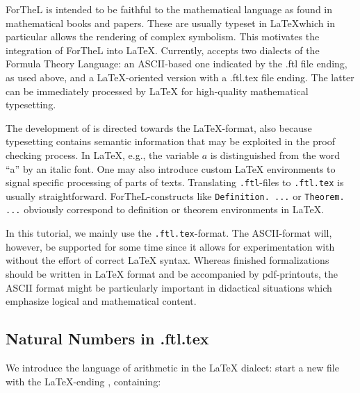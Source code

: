 \documentclass[11pt]{article}
\begin{document}
ForTheL is intended to be faithful to the mathematical
language as found in mathematical books and papers.
These are usually typeset in \LaTeX which in particular
allows the rendering of complex symbolism. This motivates the
integration of ForTheL into \LaTeX. Currently, \Naproche{}
accepts two dialects of the Formula Theory Language:
an ASCII-based one indicated by the .ftl file ending, as used above,
and a LaTeX-oriented version with a .ftl.tex file ending.
The latter can be immediately processed by \LaTeX{} for
high-quality mathematical typesetting.

The development of \Naproche{} is directed towards the \LaTeX-format,
also because typesetting contains semantic information
that may be exploited in the proof checking process.
In \LaTeX, e.g., the variable $a$ is distinguished from the word ``a''
by an italic font. One may also introduce custom \LaTeX{} environments
to signal specific processing of parts of texts.
Translating \verb+.ftl+-files to \verb+.ftl.tex+ is usually
straightforward. ForTheL-constructs like \verb+Definition. ...+
or \verb+Theorem. ...+ obviously correspond to definition or
theorem environments in \LaTeX.

In this tutorial, we mainly use the \verb+.ftl.tex+-format.
The ASCII-format will, however, be supported for some time
since it allows for experimentation with \Naproche{} without the
effort of correct \LaTeX{} syntax. Whereas finished \Naproche{}
formalizations should be written in \LaTeX{} format and be accompanied
by pdf-printouts, the ASCII format might be particularly important
in didactical situations which emphasize logical and mathematical content.

\subsection{Natural Numbers in .ftl.tex}

We introduce the language of arithmetic in the \LaTeX{} dialect:
start a new file with the \LaTeX-ending , containing:
\end{document}
